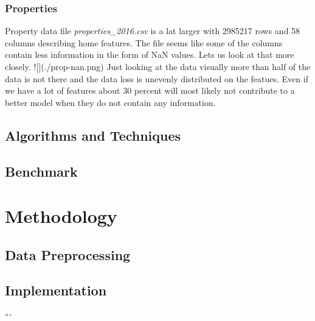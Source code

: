 \documentclass[a4paper]{article}
\begin{document}
\subsubsection{Properties}
Property data file \textit{properties\_2016.csv} is a lat larger with 2985217 rows and 58 columns describing home
features. The file seems like some of the columns contain less information in the form of NaN values. Lets us look at
that more closely.
![](./prop-nan.png)
Just looking at the data visually more than half of the data is not there and the data loss is unevenly distributed
on the featues. Even if we have a lot of features about 30 percent will most likely not contribute to a better
model when they do not contain any information.



\subsection{Algorithms and Techniques}

\subsection{Benchmark}

\section{Methodology}

\subsection{Data Preprocessing}

\subsection{Implementation}
```
\end{document}
